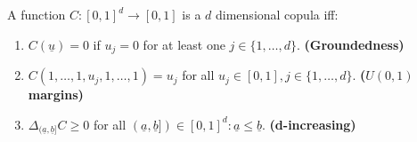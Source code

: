 \documentclass{article}
\begin{document}
	\begin{myprop}{}{}
		A function $C : [0, 1]^d\to[0, 1]$ is a $d$ dimensional copula iff:
		\begin{enumerate}[label=(\roman*)]
			\item $C(\underline{u})=0$ if $u_j=0$ for at least one $j\in\{1, \dots, d\}$. \textbf{(Groundedness)}
			
			\item $C(1, \dots, 1, u_j, 1, \dots, 1)=u_j$ for all $u_j\in[0, 1], j\in\{1, \dots, d\}$. \textbf{($U(0, 1)$ margins)}
			
			\item $\Delta_{(\underline{a}, \underline{b}]}C\geq0$ for all $(\underline{a}, \underline{b}])\in[0, 1]^d : \underline{a}\leq\underline{b}$. \textbf{(d-increasing)}
		\end{enumerate}
	\end{myprop}
	
\end{document}
